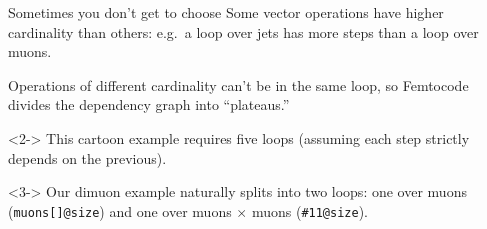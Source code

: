 \documentclass{beamer}
\begin{document}
\begin{frame}{Sometimes you don't get to choose}
\vspace{0.3 cm}
Some vector operations have higher cardinality than others: e.g.\ a loop over jets has more steps than a loop over muons.

\vspace{0.2 cm}
Operations of different cardinality can't be in the same loop, so Femtocode divides the dependency graph into ``plateaus.''

\vspace{-0.2 cm}
\begin{center}
\end{center}

\vspace{-0.3 cm}
\begin{uncoverenv}<2->
This cartoon example requires five loops (assuming each step strictly depends on the previous).
\end{uncoverenv}

\vspace{0.2 cm}
\begin{uncoverenv}<3->
Our dimuon example naturally splits into two loops: one over muons ({\tt\scriptsize muons[]@size}) and one over muons $\times$ muons ({\tt\scriptsize \#11@size}).
\end{uncoverenv}
\end{frame}
\end{document}
